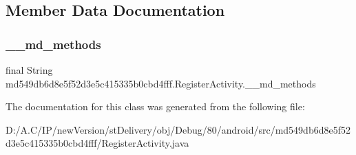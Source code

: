 \subsection{Member Data Documentation}
\mbox{\label{classmd549db6d8e5f52d3e5c415335b0cbd4fff_1_1_register_activity_ac5e2b15e9f97af04016623e389105627}} 
\subsubsection{\texorpdfstring{\+\_\+\+\_\+md\+\_\+methods}{\_\_md\_methods}}
{\footnotesize\ttfamily final String md549db6d8e5f52d3e5c415335b0cbd4fff.\+Register\+Activity.\+\_\+\+\_\+md\+\_\+methods\hspace{0.3cm}{\ttfamily [static]}}



The documentation for this class was generated from the following file\+:\begin{DoxyCompactItemize}
\item 
D\+:/\+A.\+C/\+I\+P/new\+Version/st\+Delivery/obj/\+Debug/80/android/src/md549db6d8e5f52d3e5c415335b0cbd4fff/Register\+Activity.\+java\end{DoxyCompactItemize}

